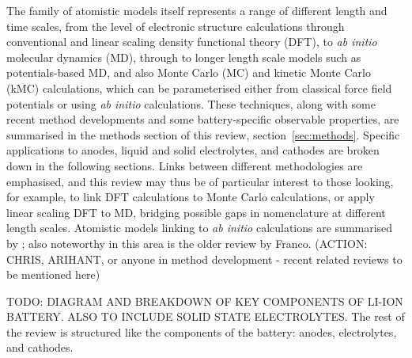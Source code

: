 \documentclass[../main.tex]{subfiles}
\begin{document}
The family of atomistic models itself represents a range of different length and time scales, from the level of electronic structure calculations through conventional and linear scaling density functional theory (DFT), to \textit{ab initio} molecular dynamics (MD), through to longer length scale models such as potentials-based MD, and also Monte Carlo (MC) and kinetic Monte Carlo (kMC) calculations, which can be parameterised either from classical force field potentials or using \textit{ab initio} calculations. These techniques, along with some recent method developments and some battery-specific observable properties, are summarised in the methods section of this review, section~\ref{sec:methods}. Specific applications to anodes, liquid and solid electrolytes, and cathodes are broken down in the following sections. Links between different methodologies are emphasised, and this review may thus be of particular interest to those looking, for example, to link DFT calculations to Monte Carlo calculations, or apply linear scaling DFT to MD, bridging possible gaps in nomenclature at different length scales. Atomistic models linking to \textit{ab initio} calculations are summarised by \citeauthor{VanderVen2020} \cite{VanderVen2020}; also noteworthy in this area is the older review by Franco. \citeauthor{franco2013multiscale} (ACTION: CHRIS, ARIHANT, or anyone in method development - recent related reviews to be mentioned here)

TODO: DIAGRAM AND BREAKDOWN OF KEY COMPONENTS OF LI-ION BATTERY. ALSO TO INCLUDE SOLID STATE ELECTROLYTES. The rest of the review is structured like the components of the battery: anodes, electrolytes, and cathodes.
\end{document}
